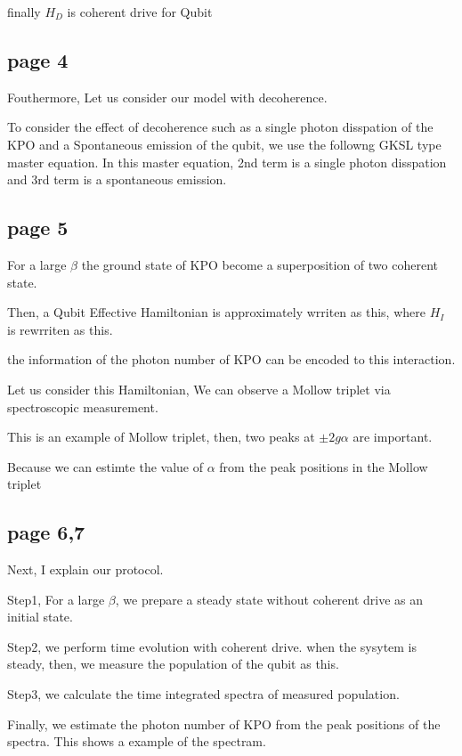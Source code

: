 {{finally $H_D$ is coherent drive for Qubit



\subsection{page 4}
Fouthermore, Let us consider our model with decoherence.

To consider the effect of decoherence such as a single photon disspation of the KPO and a Spontaneous emission of the qubit, we use the followng GKSL type master equation.
In this master equation, 2nd term is a single photon disspation and 3rd term is a spontaneous emission.


\subsection{page 5}
For a large $\beta$ the ground state of KPO  become a superposition of two coherent state.

Then, a Qubit Effective Hamiltonian is approximately wrriten as this, where $H_I$ is rewrriten as this.

the information of the photon number of KPO can be encoded to this interaction.

Let us consider this Hamiltonian, We can observe a Mollow triplet via spectroscopic measurement.

This is an example of Mollow triplet, then, two peaks at $\pm2g\alpha$ are important.

Because we can estimte the value of $\alpha$ from the peak positions in the Mollow triplet






\subsection{page 6,7}
Next, I explain our protocol.

Step1, For a large $\beta$, we prepare a steady state without coherent drive as an initial state.

Step2, we perform time evolution with coherent drive.
when the sysytem is steady, then, we measure the population of the qubit as this.

Step3, we calculate the time integrated spectra of measured population.

Finally, we estimate the photon number of KPO from the peak positions of the spectra.
This shows a example of the spectram.

}}
